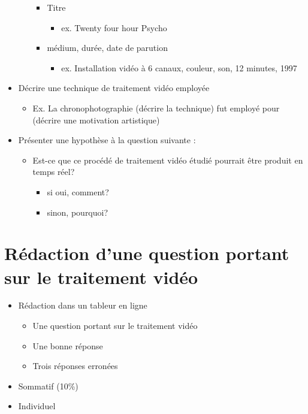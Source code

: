 \documentclass[
  french,
]{book}
\providecommand{\tightlist}{%
  \setlength{\itemsep}{0pt}\setlength{\parskip}{0pt}}
\begin{document}
\begin{itemize}
\begin{itemize}
    \begin{itemize}
    \tightlist
    \item
      Titre

      \begin{itemize}
      \tightlist
      \item
        ex. Twenty four hour Psycho
      \end{itemize}
    \item
      médium, durée, date de parution

      \begin{itemize}
      \tightlist
      \item
        ex. Installation vidéo à 6 canaux, couleur, son, 12 minutes, 1997
      \end{itemize}
    \end{itemize}
  \end{itemize}
\item
  Décrire une technique de traitement vidéo employée

  \begin{itemize}
  \tightlist
  \item
    Ex. La chronophotographie (décrire la technique) fut employé pour (décrire une motivation artistique)
  \end{itemize}
\item
  Présenter une hypothèse à la question suivante :

  \begin{itemize}
  \tightlist
  \item
    Est-ce que ce procédé de traitement vidéo étudié pourrait être produit en temps réel?

    \begin{itemize}
    \tightlist
    \item
      si oui, comment?
    \item
      sinon, pourquoi?
    \end{itemize}
  \end{itemize}
\end{itemize}

\hypertarget{sommatif_2}{%
\section{Rédaction d'une question portant sur le traitement vidéo}\label{sommatif_2}}

\begin{itemize}
\tightlist
\item
  Rédaction dans un tableur en ligne

  \begin{itemize}
  \tightlist
  \item
    Une question portant sur le traitement vidéo
  \item
    Une bonne réponse
  \item
    Trois réponses erronées\\
  \end{itemize}
\item
  Sommatif (10\%)
\item
  Individuel
\end{itemize}
\end{document}
